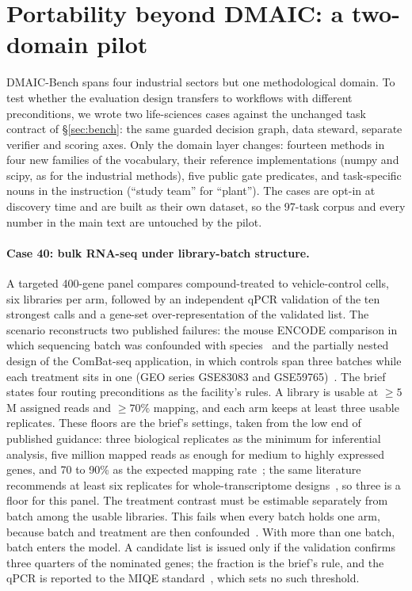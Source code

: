\section{Portability beyond DMAIC: a two-domain pilot}
\label{app:portability}

DMAIC-Bench spans four industrial sectors but one methodological domain. To test whether the
evaluation design transfers to workflows with different preconditions, we wrote two
life-sciences cases against the unchanged task contract of \S\ref{sec:bench}: the same
guarded decision graph, data steward, separate verifier and scoring axes. Only the domain layer changes: fourteen methods in four new families of the vocabulary, their reference
implementations (numpy and scipy, as for the industrial methods), five public gate predicates,
and task-specific nouns in the instruction (``study team'' for ``plant''). The cases are opt-in at
discovery time and are built as their own dataset, so the 97-task corpus and every number in
the main text are untouched by the pilot.

\paragraph{Case 40: bulk RNA-seq under library-batch structure.}
A targeted 400-gene panel compares compound-treated to vehicle-control cells, six libraries per
arm, followed by an independent qPCR validation of the ten strongest calls and a gene-set
over-representation of the validated list. The scenario reconstructs two published failures:
the mouse ENCODE comparison in which sequencing batch was confounded with
species~\citep{lin2014comparison,gilad2015reanalysis} and the partially nested design of
the ComBat-seq application, in which controls span three batches while each treatment sits in
one (GEO series GSE83083 and GSE59765)~\citep{zhang2020combatseq}.
The brief states four routing preconditions as the facility's rules. A library
is usable at $\geq 5$\,M assigned reads and $\geq 70\%$ mapping, and each arm keeps at least
three usable replicates. These floors are the brief's settings, taken from the low end of
published guidance: three biological replicates as the minimum for inferential analysis, five
million mapped reads as enough for medium to highly expressed genes, and 70 to 90\% as the
expected mapping rate~\citep{conesa2016survey}; the same literature recommends at least six
replicates for whole-transcriptome designs~\citep{schurch2016many}, so three is a floor for
this panel. The treatment contrast must
be estimable separately from batch among the usable libraries. This fails when every batch
holds one arm, because batch and treatment are then confounded~\citep{leek2010tackling}.
With more than one batch, batch enters the model. A candidate list is issued only if the
validation confirms three quarters of the nominated genes; the fraction is the brief's rule, and the qPCR is reported to the MIQE standard~\citep{bustin2009miqe}, which
sets no such threshold.

